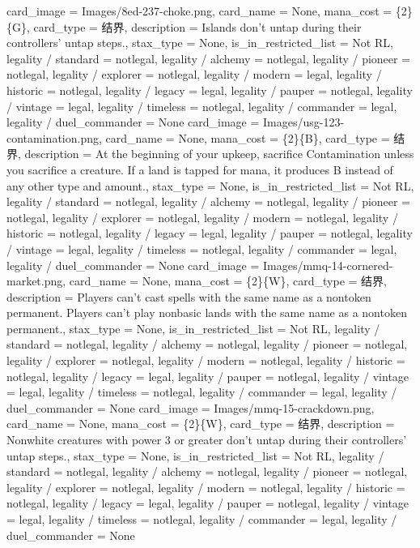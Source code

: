 \documentclass[lang = cn, color = black, 10pt]{AllThatStax}
\begin{document}
\card
{
	card_image = Images/8ed-237-choke.png,
	card_name = None,
	mana_cost = \{2\}\{G\},
	card_type = 结界,
	description = Islands don't untap during their controllers' untap steps.,
	stax_type = None,
	is_in_restricted_list = Not RL,
	legality / standard = notlegal,
	legality / alchemy = notlegal,
	legality / pioneer = notlegal,
	legality / explorer = notlegal,
	legality / modern = legal,
	legality / historic = notlegal,
	legality / legacy = legal,
	legality / pauper = notlegal,
	legality / vintage = legal,
	legality / timeless = notlegal,
	legality / commander = legal,
	legality / duel_commander = None
}
\card
{
	card_image = Images/usg-123-contamination.png,
	card_name = None,
	mana_cost = \{2\}\{B\},
	card_type = 结界,
	description = At the beginning of your upkeep, sacrifice Contamination unless you sacrifice a creature.
	If a land is tapped for mana, it produces {B} instead of any other type and amount.,
	stax_type = None,
	is_in_restricted_list = Not RL,
	legality / standard = notlegal,
	legality / alchemy = notlegal,
	legality / pioneer = notlegal,
	legality / explorer = notlegal,
	legality / modern = notlegal,
	legality / historic = notlegal,
	legality / legacy = legal,
	legality / pauper = notlegal,
	legality / vintage = legal,
	legality / timeless = notlegal,
	legality / commander = legal,
	legality / duel_commander = None
}
\card
{
	card_image = Images/mmq-14-cornered-market.png,
	card_name = None,
	mana_cost = \{2\}\{W\},
	card_type = 结界,
	description = Players can't cast spells with the same name as a nontoken permanent.
	Players can't play nonbasic lands with the same name as a nontoken permanent.,
	stax_type = None,
	is_in_restricted_list = Not RL,
	legality / standard = notlegal,
	legality / alchemy = notlegal,
	legality / pioneer = notlegal,
	legality / explorer = notlegal,
	legality / modern = notlegal,
	legality / historic = notlegal,
	legality / legacy = legal,
	legality / pauper = notlegal,
	legality / vintage = legal,
	legality / timeless = notlegal,
	legality / commander = legal,
	legality / duel_commander = None
}
\card
{
	card_image = Images/mmq-15-crackdown.png,
	card_name = None,
	mana_cost = \{2\}\{W\},
	card_type = 结界,
	description = Nonwhite creatures with power 3 or greater don't untap during their controllers' untap steps.,
	stax_type = None,
	is_in_restricted_list = Not RL,
	legality / standard = notlegal,
	legality / alchemy = notlegal,
	legality / pioneer = notlegal,
	legality / explorer = notlegal,
	legality / modern = notlegal,
	legality / historic = notlegal,
	legality / legacy = legal,
	legality / pauper = notlegal,
	legality / vintage = legal,
	legality / timeless = notlegal,
	legality / commander = legal,
	legality / duel_commander = None
}
\end{document}
